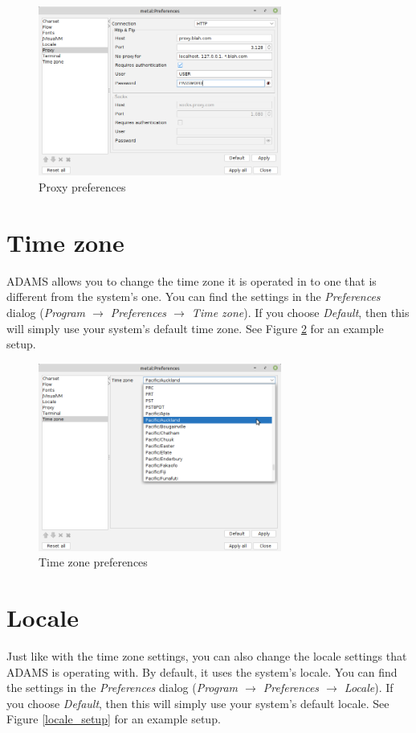 \begin{figure}[htb]
  \centering
  \includegraphics[width=8.0cm]{images/proxy_setup.png}
  \caption{Proxy preferences}
  \label{proxy_setup}
\end{figure}


\section{Time zone}
ADAMS allows you to change the time zone it is operated in to one that is
different from the system's one. You can find the settings in the
\textit{Preferences} dialog (\textit{Program $\rightarrow$ Preferences $\rightarrow$ Time zone}).
If you choose \textit{Default}, then this will simply use your system's
default time zone. See Figure \ref{timezone_setup} for an example setup.

\begin{figure}[htb]
  \centering
  \includegraphics[width=8.0cm]{images/timezone_setup.png}
  \caption{Time zone preferences}
  \label{timezone_setup}
\end{figure}


\section{Locale}
Just like with the time zone settings, you can also change the locale settings
that ADAMS is operating with. By default, it uses the system's locale.
You can find the settings in the
\textit{Preferences} dialog (\textit{Program $\rightarrow$ Preferences $\rightarrow$ Locale}).
If you choose \textit{Default}, then this will simply use your system's
default locale. See Figure \ref{locale_setup} for an example setup.

